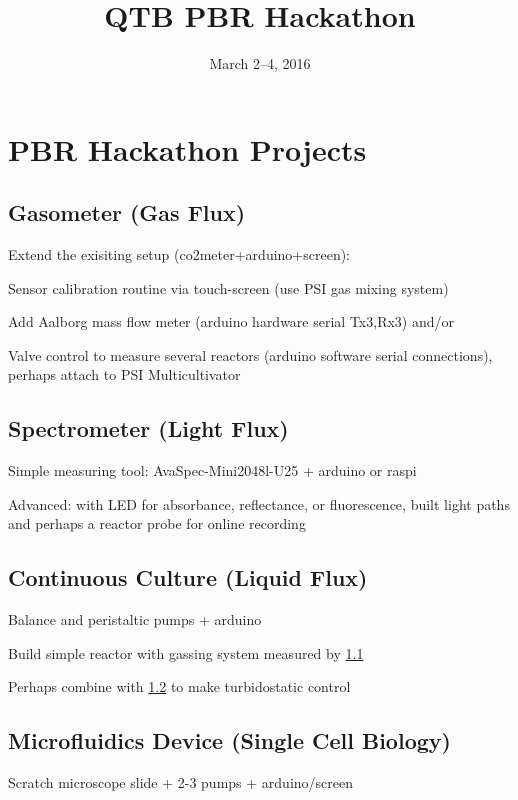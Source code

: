 \documentclass[12pt,a4paper]{article}
\title{QTB PBR Hackathon}
\date{March 2--4, 2016}
\begin{document}
\maketitle
\scriptsize
\tableofcontents
\normalsize
\newpage

\section{PBR Hackathon Projects}
\label{proj}

\subsection{Gasometer (Gas Flux)}
\label{gas}

Extend the exisiting setup (co2meter+arduino+screen): 

Sensor calibration routine via touch-screen (use PSI gas mixing system) 

Add Aalborg mass flow meter (arduino hardware serial Tx3,Rx3) and/or 

Valve control to measure several reactors (arduino software serial
connections), perhaps attach to PSI Multicultivator

\subsection{Spectrometer (Light Flux)} 
\label{spec}

Simple measuring tool: AvaSpec-Mini2048l-U25 + arduino or raspi

Advanced: with LED for absorbance, reflectance, or fluorescence,
built light paths and perhaps a reactor probe for online recording

\subsection{Continuous Culture (Liquid Flux)} 
\label{cult}

Balance and peristaltic pumps + arduino

Build simple reactor with gassing system measured by \ref{gas}

Perhaps combine with \ref{spec} to make turbidostatic control

\subsection{Microfluidics Device (Single Cell Biology)} 
\label{micro}

Scratch microscope slide + 2-3 pumps + arduino/screen
\end{document}

